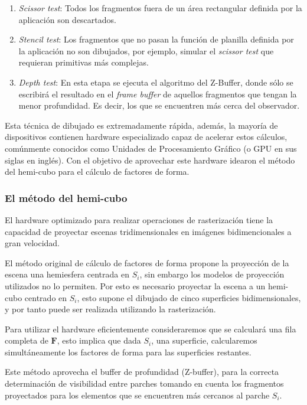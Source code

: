 \begin{enumerate}
\begin{enumerate}
			\item \textit{Scissor test}: Todos los fragmentos fuera de un área rectangular definida por la aplicación son descartados.
			\item \textit{Stencil test}: Los fragmentos que no pasan la función de planilla definida por la aplicación no son dibujados, por ejemplo, simular el \textit{scissor test} que requieran primitivas más complejas.
			\item \textit{Depth test}: En esta etapa se ejecuta el algoritmo del Z-Buffer, donde sólo se escribirá el resultado en el \textit{frame buffer} de aquellos fragmentos que tengan la menor profundidad. Es decir, los que se encuentren más cerca del observador.
		\end{enumerate}
\end{enumerate}

Esta técnica de dibujado es extremadamente rápida, además, la mayoría de dispositivos contienen hardware especializado capaz de acelerar estos cálculos, comúnmente conocidos como Unidades de Procesamiento Gráfico (o GPU en sus siglas en inglés). Con el objetivo de aprovechar este hardware \citeauthor{Cohen} idearon el método del hemi-cubo para el cálculo de factores de forma.

\subsubsection{El método del hemi-cubo}

El hardware optimizado para realizar operaciones de rasterización tiene la capacidad de proyectar escenas tridimensionales en imágenes bidimencionales a gran velocidad. 

El método original de cálculo de factores de forma propone la proyección de la escena una hemiesfera centrada en $S_{i}$, sin embargo los modelos de proyección utilizados no lo permiten. Por esto es necesario proyectar la escena a un hemi-cubo centrado en $S_{i}$, esto supone el dibujado de cinco superficies bidimensionales, y por tanto puede ser realizada utilizando la rasterización.

Para utilizar el hardware eficientemente consideraremos que se calculará una fila completa de $\mathbf{F}$, esto implica que dada $S_{i}$, una superficie, calcularemos simultáneamente los factores de forma para las superficies restantes. 

Este método aprovecha el buffer de profundidad (Z-buffer), para la correcta determinación de visibilidad entre parches tomando en cuenta los fragmentos proyectados para los elementos que se encuentren más cercanos al parche $S_{i}$.


